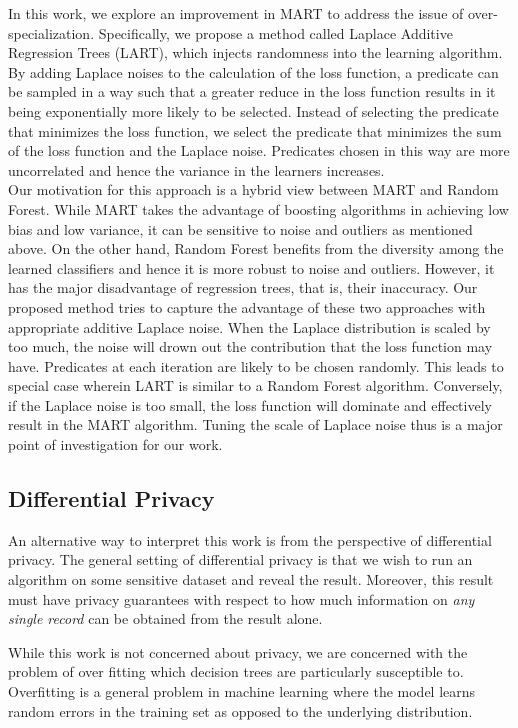 \documentclass{article} %
\begin{document}
In this work, we explore an improvement in MART to address the issue of over-specialization. Specifically, we propose a method called Laplace Additive Regression Trees (LART), which injects randomness into the learning algorithm.
By adding Laplace noises to the calculation of the loss function, a predicate can be sampled in a way such that a greater reduce in the loss function results in it being exponentially more likely to be selected. Instead of selecting the predicate that minimizes the loss function, we select the predicate that minimizes the sum of the loss function and the Laplace noise. Predicates chosen in this way are more uncorrelated and hence the variance in the learners increases.\\

Our motivation for this approach is a hybrid view between MART and Random Forest. While MART takes the advantage of boosting algorithms in achieving low bias and low variance, it can be sensitive to noise and outliers as mentioned above. On the other hand, Random Forest benefits from the diversity among the learned classifiers and hence it is more robust to noise and outliers. However, it has the major disadvantage of regression trees, that is, their inaccuracy. Our proposed method tries to capture the advantage of these two approaches with appropriate additive Laplace noise. When the Laplace distribution is scaled by too much, the noise will drown out the contribution that the loss function may have. Predicates at each iteration are likely to be chosen randomly. This leads to special case wherein LART is similar to a Random Forest algorithm. Conversely, if the Laplace noise is too small, the loss function will dominate and effectively result in the MART algorithm. Tuning the scale of Laplace noise thus is a major point of investigation for our work.



\subsection{Differential Privacy }

An alternative way to interpret this work is from the perspective of differential privacy. The general setting of differential privacy is that we wish to run an algorithm on some sensitive dataset and reveal the result. Moreover, this result must have privacy guarantees with respect to how much information on \emph{any single record} can be obtained from the result alone. 

While this work is not concerned about privacy, we are concerned with the problem of over fitting which decision trees are particularly susceptible to. Overfitting is a general problem in machine learning where the model learns random errors in the training set as opposed to the underlying distribution. 
\end{document}
